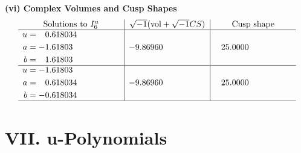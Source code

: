 \documentclass[1p]{elsarticle_modified}
\theoremstyle{definition}
\newcommand{\I}{\sqrt{-1}}
\begin{document}
\newpage\flushleft \textbf{(vi) Complex Volumes and Cusp Shapes}
$$\begin{array}{c|c|c}  
\text{Solutions to }I^u_{6}& \I (\text{vol} + \sqrt{-1}CS) & \text{Cusp shape}\\
 \hline 
\begin{aligned}
u &= \phantom{-}0.618034\phantom{ +0.000000I} \\
a &= -1.61803\phantom{ +0.000000I} \\
b &= \phantom{-}1.61803\phantom{ +0.000000I}\end{aligned}
 & -9.86960\phantom{ +0.000000I} & \phantom{-}25.0000\phantom{ +0.000000I} \\ \hline\begin{aligned}
u &= -1.61803\phantom{ +0.000000I} \\
a &= \phantom{-}0.618034\phantom{ +0.000000I} \\
b &= -0.618034\phantom{ +0.000000I}\end{aligned}
 & -9.86960\phantom{ +0.000000I} & \phantom{-}25.0000\phantom{ +0.000000I}\\
 \hline 
 \end{array}$$\newpage
\newpage\renewcommand{\arraystretch}{1}
\centering \section*{ VII. u-Polynomials}
\end{document}
